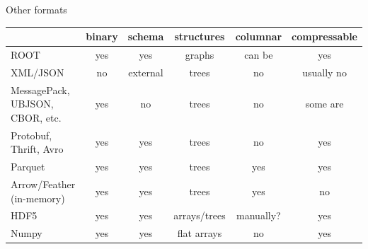 \documentclass{beamer}
\begin{document}
\begin{frame}{Other formats}
\vspace{0.5 cm}
\renewcommand{\arraystretch}{1.2}
\mbox{\hspace{-0.8 cm}}\begin{tabular}{p{2 cm} c c c c c}
                          & binary & schema     & structures   & columnar & compressable\\\hline
ROOT                      & yes    & yes        & graphs       & can be   & yes         \\
XML/JSON                  & no     & external   & trees        & no       & usually no  \\
MessagePack, UBJSON, CBOR, etc.   & yes    & no         & trees        & no       & some are    \\
Protobuf, Thrift, Avro    & yes    & yes        & trees        & no       & yes         \\
Parquet                   & yes    & yes        & trees        & yes      & yes         \\
Arrow/Feather (in-memory) & yes    & yes        & trees        & yes      & no          \\
HDF5                      & yes    & yes        & arrays/trees & manually?& yes         \\
Numpy                     & yes    & yes        & flat arrays  & no       & yes         \\
\end{tabular}
\end{frame}
\end{document}
